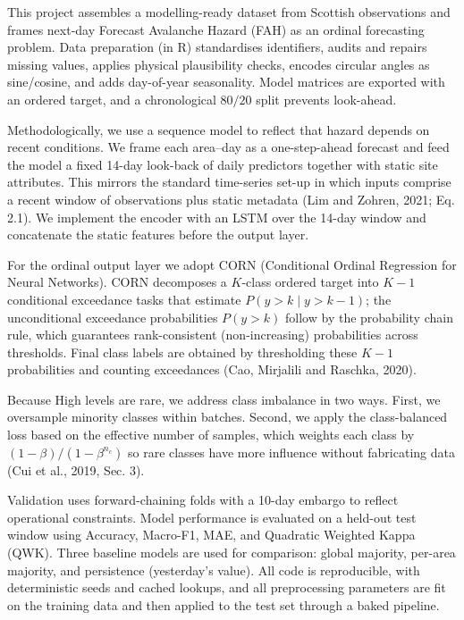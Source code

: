 \documentclass[
  letterpaper,
  DIV=11,
  numbers=noendperiod]{scrartcl}
\begin{document}
This project assembles a modelling-ready dataset from Scottish
observations and frames next-day Forecast Avalanche Hazard (FAH) as an
ordinal forecasting problem. Data preparation (in R) standardises
identifiers, audits and repairs missing values, applies physical
plausibility checks, encodes circular angles as sine/cosine, and adds
day-of-year seasonality. Model matrices are exported with an ordered
target, and a chronological \(80/20\) split prevents look-ahead.

Methodologically, we use a sequence model to reflect that hazard depends
on recent conditions. We frame each area--day as a one-step-ahead
forecast and feed the model a fixed 14-day look-back of daily predictors
together with static site attributes. This mirrors the standard
time-series set-up in which inputs comprise a recent window of
observations plus static metadata (Lim and Zohren, 2021; Eq. 2.1). We
implement the encoder with an LSTM over the 14-day window and
concatenate the static features before the output layer.

For the ordinal output layer we adopt CORN (Conditional Ordinal
Regression for Neural Networks). CORN decomposes a \(K\)-class ordered
target into \(K - 1\) conditional exceedance tasks that estimate
\(P(y > k \mid y > k - 1)\); the unconditional exceedance probabilities
\(P(y > k)\) follow by the probability chain rule, which guarantees
rank-consistent (non-increasing) probabilities across thresholds. Final
class labels are obtained by thresholding these \(K - 1\) probabilities
and counting exceedances (Cao, Mirjalili and Raschka, 2020).

Because High levels are rare, we address class imbalance in two ways.
First, we oversample minority classes within batches. Second, we apply
the class-balanced loss based on the effective number of samples, which
weights each class by \((1 - \beta)/(1 - \beta^{n_c})\) so rare classes
have more influence without fabricating data (Cui et al., 2019, Sec. 3).

Validation uses forward-chaining folds with a 10-day embargo to reflect
operational constraints. Model performance is evaluated on a held-out
test window using Accuracy, Macro-F1, MAE, and Quadratic Weighted Kappa
(QWK). Three baseline models are used for comparison: global majority,
per-area majority, and persistence (yesterday's value). All code is
reproducible, with deterministic seeds and cached lookups, and all
preprocessing parameters are fit on the training data and then applied
to the test set through a baked pipeline.
\end{document}
